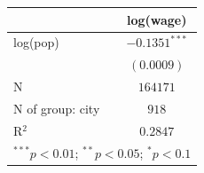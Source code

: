 
\begin{tabular}{l c}
\hline
 & log(wage) \\
\hline
log(pop)         & $-0.1351^{***}$ \\
                 & $(0.0009)$      \\
\hline
N                & $164171$        \\
N of group: city & $918$           \\
R$^2$            & $0.2847$        \\
\hline
\multicolumn{2}{l}{\scriptsize{$^{***}p<0.01$; $^{**}p<0.05$; $^{*}p<0.1$}}
\end{tabular}

